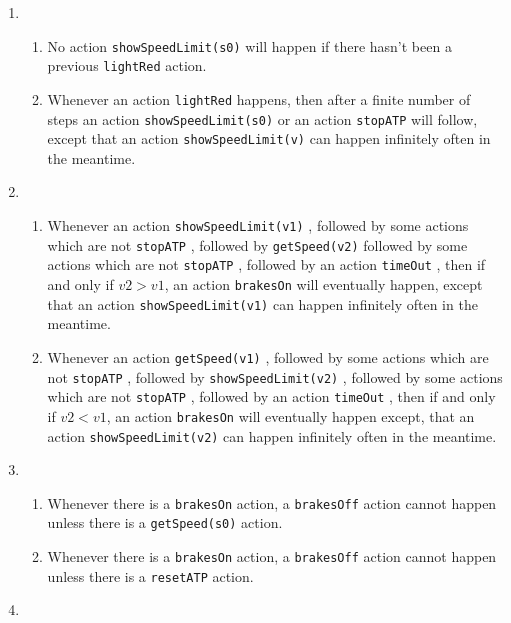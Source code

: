 \documentclass[11pt,a4paper]{article}
\newcommand{\stopATP}{\texttt{stopATP} }
\newcommand{\resetATP}{\texttt{resetATP} }
\newcommand{\getSpeed}[1]{\texttt{getSpeed(#1)} }
\newcommand{\lightRed}{\texttt{lightRed} }
\newcommand{\showSpeedLimit}[1]{\texttt{showSpeedLimit(#1)} }
\newcommand{\timeOut}{\texttt{timeOut} }
\newcommand{\brakesOn}{\texttt{brakesOn} }
\newcommand{\brakesOff}{\texttt{brakesOff} }
\begin{document}
\begin{enumerate}
		\item 
    \begin{enumerate}

    \item No action \showSpeedLimit{s0} will happen if there hasn't been a previous \lightRed action.
		
		\item Whenever an action \lightRed happens, then after a finite number of steps an action \showSpeedLimit{s0} or an action \stopATP will follow, except that an action \showSpeedLimit{v} can happen infinitely often in the meantime.
		 \end{enumerate}
		
		\item 
    \begin{enumerate}

    \item Whenever an action \showSpeedLimit{v1}, followed by some actions which are not \stopATP, followed by \getSpeed{v2} followed by some actions which are not \stopATP, followed by an action \timeOut, then if and only if $v2>v1$, an action \brakesOn will eventually happen, except that an action \showSpeedLimit{v1} can happen infinitely often in the meantime.
		
		\item Whenever an action \getSpeed{v1}, followed by some actions which are not \stopATP, followed by \showSpeedLimit{v2}, followed by some actions which are not \stopATP, followed by an action \timeOut, then if and only if $v2<v1$, an action \brakesOn will eventually happen except, that an action \showSpeedLimit{v2} can happen infinitely often in the meantime.
		
		 \end{enumerate}

		\item 
    \begin{enumerate}
		
    \item Whenever there is a  \brakesOn action, a \brakesOff action cannot happen unless there is a \getSpeed{s0} action. 
		
		\item Whenever there is a  \brakesOn action, a \brakesOff action cannot happen unless there is a \resetATP action. 
		
		\end{enumerate}
	\item
    \begin{enumerate}
		

\end{enumerate}
\end{enumerate}
\end{document}
